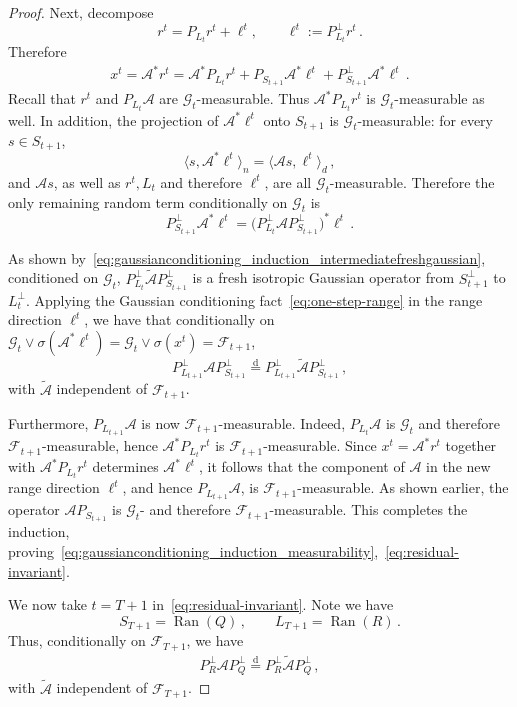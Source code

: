 \documentclass[10pt,a4paper]{amsart}
\newcommand{\cA}{\mathcal A}
\begin{document}
\begin{proof}
Next, decompose
\[
  r^t=P_{L_t}r^t+\ell^t,
  \qquad
  \ell^t:=P_{L_t}^\perp r^t\,.
\]
Therefore
\begin{align*}
x^t = \mathcal A^*r^t = \mathcal A^*P_{L_t}r^t + P_{S_{t+1}} \cA^* \ell^t  + P_{S_{t+1}}^\perp \cA^* \ell^t\,.
\end{align*}
Recall that $r^t$ and $P_{L_t}\mathcal A$ are $\mathscr G_t$-measurable. Thus $\mathcal A^*P_{L_t}r^t$ is $\mathscr G_t$-measurable as well. In addition, the projection of $\mathcal A^*\ell^t$ onto $S_{t+1}$ is $\mathscr G_t$-measurable: for every $s\in S_{t+1}$,
\[
  \langle s,\mathcal A^*\ell^t\rangle_{n}
  =
  \langle \mathcal A s,\ell^t\rangle_{d}\,,
\]
and $\mathcal A s$, as well as $r^t, L_t$ and therefore $\ell^t$, are all $\mathscr G_t$-measurable. Therefore the only remaining random term conditionally on $\mathscr G_t$ is
\[
  P_{S_{t+1}}^\perp\mathcal A^*\ell^t
  =
  \big(P_{L_t}^\perp\mathcal A P_{S_{t+1}}^\perp\big)^*\ell^t\,.
\]

As shown by~\eqref{eq:gaussianconditioning_induction_intermediatefreshgaussian}, conditioned on $\mathscr G_t$, $P_{L_t}^\perp \widetilde{\mathcal A} P_{S_{t+1}}^\perp$ is a fresh isotropic Gaussian operator from $S_{t+1}^\perp$ to $L_t^\perp$. Applying the Gaussian conditioning fact~\eqref{eq:one-step-range} in the range direction $\ell^t$, we have that conditionally on
$\mathscr G_t\vee \sigma(\cA^* \ell^t) = \mathscr G_t\vee\sigma(x^t) = \mathscr F_{t+1}$,
\[
  P_{L_{t+1}}^\perp \mathcal A P_{S_{t+1}}^\perp
  \stackrel{\mathrm d}{=}
  P_{L_{t+1}}^\perp \widetilde{\mathcal A}P_{S_{t+1}}^\perp\,,
\]
with $\widetilde{\mathcal A}$ independent of $\mathscr F_{t+1}$.

Furthermore, $P_{L_{t+1}}\mathcal A$ is now $\mathscr F_{t+1}$-measurable. Indeed, $P_{L_t}\mathcal A$ is $\mathscr G_t$ and therefore $\mathscr F_{t+1}$-measurable, hence $\mathcal A^*P_{L_t}r^t$ is $\mathscr F_{t+1}$-measurable. Since $x^t=\mathcal A^*r^t$ together with $\mathcal A^*P_{L_t}r^t$ determines $\mathcal A^*\ell^t$, it follows that the component of $\mathcal A$ in the new range direction $\ell^t$, and hence $P_{L_{t+1}}\mathcal A$, is $\mathscr F_{t+1}$-measurable. As shown earlier, the operator $\mathcal A P_{S_{t+1}}$ is $\mathscr G_t$- and therefore $\mathscr F_{t+1}$-measurable. This completes the induction, proving~\eqref{eq:gaussianconditioning_induction_measurability},~\eqref{eq:residual-invariant}.

We now take $t=T+1$ in~\eqref{eq:residual-invariant}. Note we have
\[
  S_{T+1}=\operatorname{Ran}(Q)\,,
  \qquad
  L_{T+1}=\operatorname{Ran}(R)\,.
\]
Thus, conditionally on $\mathscr F_{T+1}$, we have
\begin{align}\label{eq:residual-invariant-result}
  P_R^\perp \mathcal A P_Q^\perp
  \stackrel{\mathrm d}{=}
  P_R^\perp\widetilde{\mathcal A}P_Q^\perp\,,
\end{align}
with $\widetilde{\mathcal A}$ independent of $\mathscr F_{T+1}$.


\end{proof}
\end{document}
